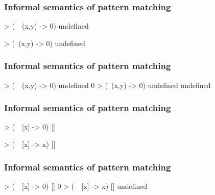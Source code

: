 \documentclass{beamer}
\begin{document}

\begin{frame}[fragile]
  \frametitle{Informal semantics of pattern matching}

  \begin{example}
    \begin{code}
> (\ ~(x,y) -> 0) undefined

> (\  (x,y) -> 0) undefined

    \end{code}
  \end{example}
\end{frame}

\begin{frame}[fragile]
  \frametitle{Informal semantics of pattern matching}

  \begin{example}
    \begin{code}
> (\ ~(x,y) -> 0) undefined
0
> (\  (x,y) -> 0) undefined
undefined
    \end{code}
  \end{example}
\end{frame}


\begin{frame}[fragile]
  \frametitle{Informal semantics of pattern matching}

  \begin{example}
    \begin{code}
> (\ ~[x] -> 0) []

> (\ ~[x] -> x) []

    \end{code}
  \end{example}
\end{frame}

\begin{frame}[fragile]
  \frametitle{Informal semantics of pattern matching}

  \begin{example}
    \begin{code}
> (\ ~[x] -> 0) []
0
> (\ ~[x] -> x) []
undefined
    \end{code}
  \end{example}
\end{frame}

\end{document}
